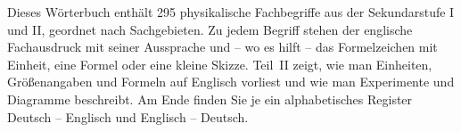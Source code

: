 \makeatletter
\newcommand\teil{\begingroup\shorthandoff{"}\teil@aux}
\newcommand\teil@aux[3]{\endgroup\part[#1 -- #2]{\raggedright #1\\[5pt]{\normalfont\Large\color{black!55}#2\hspace{0.35em}\penalty0 \ipa{#3}}}}
\newcommand\kapitel{\begingroup\shorthandoff{"}\kapitel@aux}
\newcommand\kapitel@aux[3]{\endgroup\section[#1 -- #2]{\raggedright #1\\[0pt]{\normalfont\small\color{black!55}#2\hspace{0.35em}\penalty0 \ipa{#3}}}}
\newcommand\zwischen{\begingroup\shorthandoff{"}\zwischen@aux}
\newcommand\zwischen@aux[3]{\endgroup\subsection*{\raggedright #1 {\normalfont\small\color{black!55}\,--\, #2\hspace{0.35em}\penalty0 \ipa{#3}}}}
\renewcommand\lies@aux[3]{\endgroup #1 & #2\newline{\color{black!60}#3} \\[1.5pt]}
\makeatother
\setlength{\aboverulesep}{0.15ex}\setlength{\belowrulesep}{0.3ex}\renewcommand{\arraystretch}{0.93}



\maketitle

Dieses Wörterbuch enthält 295 physikalische Fachbegriffe aus der Sekundarstufe I und II,
geordnet nach Sachgebieten. Zu jedem Begriff stehen der englische Fachausdruck mit seiner Aussprache und
-- wo es hilft -- das Formelzeichen mit Einheit, eine Formel oder eine kleine Skizze. Teil~II zeigt, wie
man Einheiten, Größenangaben und Formeln auf Englisch vorliest und wie man Experimente und Diagramme
beschreibt. Am Ende finden Sie je ein alphabetisches Register Deutsch -- Englisch und Englisch -- Deutsch.

